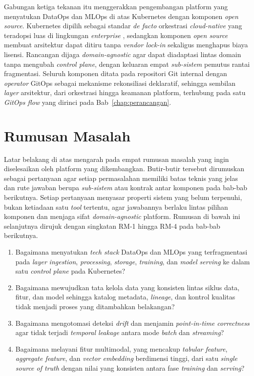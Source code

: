 Gabungan ketiga tekanan itu menggerakkan pengembangan platform yang menyatukan DataOps dan MLOps di atas Kubernetes dengan komponen \textit{open source}. Kubernetes dipilih sebagai standar \textit{de facto} orkestrasi \textit{cloud-native} yang teradopsi luas di lingkungan \textit{enterprise} \autocite{lakka2025kubernetes}, sedangkan komponen \textit{open source} membuat arsitektur dapat ditiru tanpa \textit{vendor lock-in} sekaligus menghapus biaya lisensi. Rancangan dijaga \textit{domain-agnostic} agar dapat diadaptasi lintas domain tanpa mengubah \textit{control plane}, dengan keluaran empat \textit{sub-sistem} pemutus rantai fragmentasi. Seluruh komponen ditata pada repositori Git internal dengan \textit{operator} GitOps sebagai mekanisme rekonsiliasi deklaratif, sehingga sembilan \textit{layer} arsitektur, dari orkestrasi hingga keamanan platform, terhubung pada satu \textit{GitOps flow} yang dirinci pada Bab~\ref{chap:perancangan}.


\section{Rumusan Masalah}
\label{sec:rumusan-masalah}

Latar belakang di atas mengarah pada empat rumusan masalah yang ingin diselesaikan oleh platform yang dikembangkan. Butir-butir tersebut dirumuskan sebagai pertanyaan agar setiap permasalahan memiliki batas teknis yang jelas dan rute jawaban berupa \textit{sub-sistem} atau kontrak antar komponen pada bab-bab berikutnya. Setiap pertanyaan menyasar properti sistem yang belum terpenuhi, bukan ketiadaan satu \textit{tool} tertentu, agar jawabannya berlaku lintas pilihan komponen dan menjaga sifat \textit{domain-agnostic} platform. Rumusan di bawah ini selanjutnya dirujuk dengan singkatan RM-1 hingga RM-4 pada bab-bab berikutnya.

\vspace{0.5em}
\begin{enumerate}
    \item Bagaimana menyatukan \textit{tech stack} DataOps dan MLOps yang terfragmentasi pada \textit{layer} \textit{ingestion}, \textit{processing}, \textit{storage}, \textit{training}, dan \textit{model serving} ke dalam satu \textit{control plane} pada Kubernetes?

    \item Bagaimana mewujudkan tata kelola data yang konsisten lintas siklus data, fitur, dan model sehingga katalog metadata, \textit{lineage}, dan kontrol kualitas tidak menjadi proses yang ditambahkan belakangan?

    \item Bagaimana mengotomasi deteksi \textit{drift} dan menjamin \textit{point-in-time correctness} agar tidak terjadi \textit{temporal leakage} antara mode \textit{batch} dan \textit{streaming}?

    \item Bagaimana melayani fitur multimodal, yang mencakup \textit{tabular feature}, \textit{aggregate feature}, dan \textit{vector embedding} berdimensi tinggi, dari satu \textit{single source of truth} dengan nilai yang konsisten antara fase \textit{training} dan \textit{serving}?
\end{enumerate}

